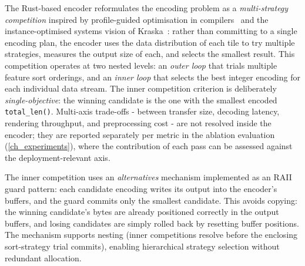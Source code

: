 The Rust-based encoder reformulates the encoding problem as a \emph{multi-strategy competition} inspired by profile-guided optimisation in compilers~\cite{changUsingProfileInformation1991} and the instance-optimised systems vision of Kraska~\cite{kraskaInstanceOptimizedData2021}: rather than committing to a single encoding plan, the encoder uses the data distribution of each tile to try multiple strategies, measures the output size of each, and selects the smallest result.
This competition operates at two nested levels: an \emph{outer loop} that trials multiple feature sort orderings, and an \emph{inner loop} that selects the best integer encoding for each individual data stream.
The inner competition criterion is deliberately \emph{single-objective}: the winning candidate is the one with the smallest encoded \texttt{total\_len()}.
Multi-axis trade-offs - between transfer size, decoding latency, rendering throughput, and preprocessing cost - are not resolved inside the encoder; they are reported separately per metric in the ablation evaluation (\cref{ch_experiments}), where the contribution of each pass can be assessed against the deployment-relevant axis.

The inner competition uses an \emph{alternatives} mechanism implemented as an RAII guard pattern: each candidate encoding writes its output into the encoder's buffers, and the guard commits only the smallest candidate.
This avoids copying: the winning candidate's bytes are already positioned correctly in the output buffers, and losing candidates are simply rolled back by resetting buffer positions.
The mechanism supports nesting (inner competitions resolve before the enclosing sort-strategy trial commits), enabling hierarchical strategy selection without redundant allocation.

